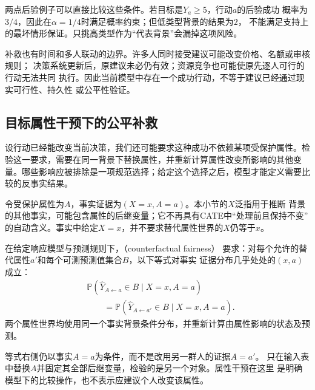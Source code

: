 两点后验例子可以直接比较这些条件。若目标是\(Y_a\geq5\)，行动\(a\)的后验成功
概率为\(3/4\)，因此在\(\alpha=1/4\)时满足概率约束；但低类型背景的结果为\(2\)，
不能满足支持上的最坏情形保证。只挑高类型作为“代表背景”会漏掉这项风险。

补救也有时间和多人联动的边界。许多人同时接受建议可能改变价格、名额或审核规则；
决策系统更新后，原建议未必仍有效；资源竞争也可能使原先逐人可行的行动无法共同
执行。因此当前模型中存在一个成功行动，不等于建议已经通过现实可行性、持久性
或公平性验证。

\subsection{目标属性干预下的公平补救}
\label{sec:causal-fair-recourse}

设行动已经能改变当前决策，我们还可能要求这种成功不依赖某项受保护属性。检验这一要求，需要在同一背景下替换属性，并重新计算属性改变所影响的其他变量。哪些影响应被排除是一项规范选择；给定这个选择之后，模型才能定义需要比较的反事实结果。

令受保护属性为\(A\)，事实证据为\((X=x,A=a)\)。本小节的\(X\)泛指用于推断
背景的其他事实，可能包含属性的后继变量；它不再具有CATE中“处理前且保持不变”
的自动含义。事实中给定\(X=x\)，并不要求替代属性世界的\(X\)仍等于\(x\)。
\begin{definition}[反事实公平]
  \label{def:causal-counterfactual-fairness}
  在给定响应模型与预测规则下，（counterfactual fairness）
  要求：对每个允许的替代属性\(a'\)和每个可测预测值集合\(B\)，以下等式对事实
  证据分布几乎处处的\((x,a)\)成立：
  \begin{equation}
    \begin{aligned}
      &\mathbb P(\widehat Y_{A\leftarrow a}\in B\mid X=x,A=a)\\
      &\qquad=
      \mathbb P(\widehat Y_{A\leftarrow a'}\in B\mid X=x,A=a).
    \end{aligned}
    \label{eq:causal-counterfactual-fairness}
  \end{equation}
  两个属性世界均使用同一个事实背景条件分布，并重新计算由属性影响的状态及预测。
\end{definition}

等式右侧仍以事实\(A=a\)为条件，而不是改用另一群人的证据\(A=a'\)。
只在输入表中替换\(A\)并固定其全部后继变量，检验的是另一个对象。属性干预在这里
是明确模型下的比较操作，也不表示应建议个人改变该属性。

